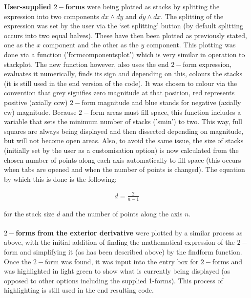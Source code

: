 \documentclass[12pt]{report}
\begin{document}
\textbf{User-supplied $2-$forms} were being plotted as stacks by splitting the expression into two components $dx\wedge dy$ and $dy\wedge dx$. The splitting of the expression was set by the user via the `set splitting' button (by default splitting occurs into two equal halves). These have then been plotted as previously stated, one as the $x$ component and the other as the $y$ component. This plotting was done via a function ('form\textunderscore components\textunderscore plot') which is very similar in operation to stack\textunderscore plot. The new function however, also uses the end $2-$form expression, evaluates it numerically, finds its sign and depending on this, colours the stacks (it is still used in the end version of the code). It was chosen to colour via the convention that grey signifies zero magnitude at that position, red represents positive (axially ccw) $2-$form magnitude and blue stands for negative (axially cw) magnitude. Because $2-$form areas must fill space, this function includes a variable that sets the minimum number of stacks ('s\textunderscore min') to two. This way, full squares are always being displayed and then dissected depending on magnitude, but will not become open areas. Also, to avoid the same issue, the size of stacks (initially set by the user as a customisation option) is now calculated from the chosen number of points along each axis automatically to fill space (this occurs when tabs are opened and when the number of points is changed). The equation by which this is done is the following:

\begin{equation}
	\label{T2} \begin{split}
		d = \frac{2}{n-1}
	\end{split}
\end{equation}

for the stack size $d$ and the number of points along the axis $n$. \\~\\


\textbf{$2-$forms from the exterior derivative} were plotted by a similar process as above, with the initial addition of finding the mathematical expression of the $2-$form and simplifying it (as has been described above) by the find\textunderscore form function. Once the $2-$form was found, it was input into the entry box for $2-$forms and was highlighted in light green to show what is currently being displayed (as opposed to other options including the supplied 1-forms). This process of highlighting is still used in the end resulting code. \\~\\
\end{document}
